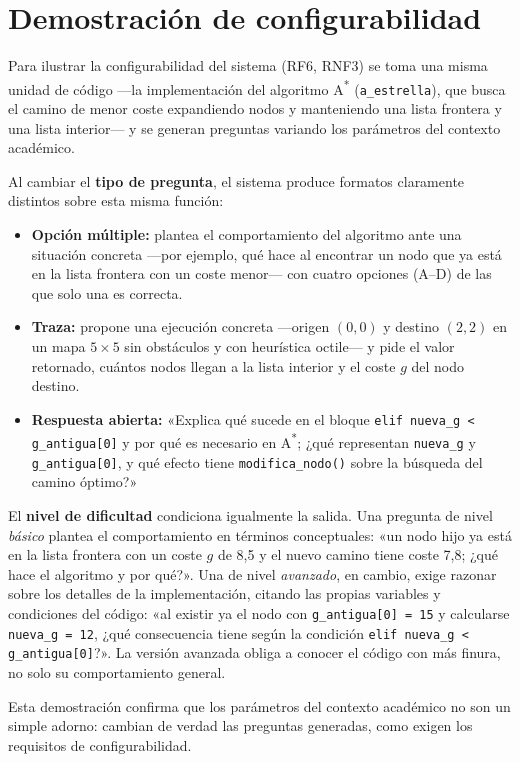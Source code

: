 \section{Demostración de configurabilidad}
\label{sec:res-configurabilidad}

Para ilustrar la configurabilidad del sistema (RF6, RNF3) se toma una misma
unidad de código ---la implementación del algoritmo A\textsuperscript{*}
(\texttt{a\_estrella}), que busca el camino de menor coste expandiendo nodos y
manteniendo una lista frontera y una lista interior--- y se generan preguntas
variando los parámetros del contexto académico.

Al cambiar el \textbf{tipo de pregunta}, el sistema produce formatos claramente
distintos sobre esta misma función:

\begin{itemize}
  \item \textbf{Opción múltiple:} plantea el comportamiento del algoritmo ante
        una situación concreta ---por ejemplo, qué hace al encontrar un nodo que
        ya está en la lista frontera con un coste menor--- con cuatro opciones
        (A--D) de las que solo una es correcta.
  \item \textbf{Traza:} propone una ejecución concreta ---origen $(0,0)$ y
        destino $(2,2)$ en un mapa $5\times5$ sin obstáculos y con heurística
        octile--- y pide el valor retornado, cuántos nodos llegan a la lista
        interior y el coste $g$ del nodo destino.
  \item \textbf{Respuesta abierta:} «Explica qué sucede en el bloque
        \texttt{elif nueva\_g < g\_antigua[0]} y por qué es necesario en
        A\textsuperscript{*}; ¿qué representan \texttt{nueva\_g} y
        \texttt{g\_antigua[0]}, y qué efecto tiene \texttt{modifica\_nodo()}
        sobre la búsqueda del camino óptimo?»
\end{itemize}

El \textbf{nivel de dificultad} condiciona igualmente la salida. Una pregunta
de nivel \emph{básico} plantea el
comportamiento en términos conceptuales: «un nodo hijo ya está en la lista
frontera con un coste $g$ de 8{,}5 y el nuevo camino tiene coste 7{,}8; ¿qué
hace el algoritmo y por qué?». Una de nivel \emph{avanzado}, en cambio, exige
razonar sobre los detalles de la implementación, citando las propias variables
y condiciones del código: «al existir ya el nodo con
\texttt{g\_antigua[0] = 15} y calcularse \texttt{nueva\_g = 12}, ¿qué
consecuencia tiene según la condición \texttt{elif nueva\_g < g\_antigua[0]}?».
La versión avanzada obliga a conocer el código con más finura, no solo su
comportamiento general.

Esta demostración confirma que los parámetros del contexto académico no son un
simple adorno: cambian de verdad las preguntas generadas, como exigen los
requisitos de configurabilidad.
